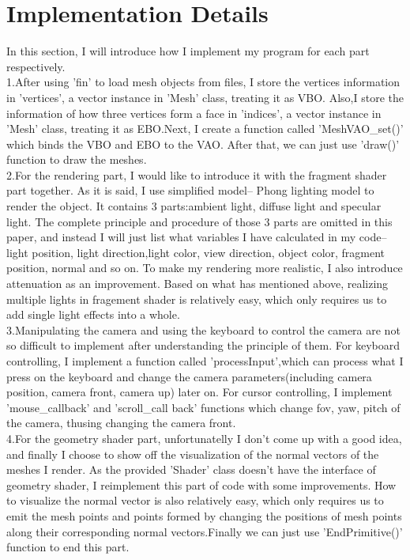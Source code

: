 \documentclass[acmtog]{acmart}
\begin{document}
\section{Implementation Details}
\qquad In this section, I will introduce how I implement my program for each part respectively.
\\\indent1.After using 'fin' to load mesh objects from files, I store the vertices information in 'vertices', a vector instance in 'Mesh' class, treating it as VBO. Also,I store the information of how three vertices form a face in 'indices', a vector instance in 'Mesh' class, treating it as EBO.Next, I create a function called 'MeshVAO\_set()' which binds the VBO and EBO to the VAO. After that, we can just use 'draw()' function to draw the meshes.
\\\indent2.For the rendering part, I would like to introduce it with the fragment shader part together. As it is said, I use simplified model-- Phong lighting model to render the object. It contains 3 parts:ambient light, diffuse light and specular light. The complete principle and procedure of those 3 parts are omitted in this paper, and instead I will just list what variables I have calculated in my code--light position, light direction,light color, view direction, object color, fragment position, normal and so on. To make my rendering more realistic, I also introduce attenuation as an improvement. Based on what has mentioned above, realizing multiple lights in fragement shader is relatively easy, which only requires us to add single light effects into a whole.
\\\indent3.Manipulating the camera and using the keyboard to control the camera are not so difficult to implement after understanding the principle of them. For keyboard controlling, I implement a function called 'processInput',which can process what I press on the keyboard and change the camera parameters(including camera position, camera front, camera up) later on. For cursor controlling, I implement 'mouse\_callback' and 'scroll\_call back' functions which change fov, yaw, pitch of the camera, thusing changing the camera front.
\\\indent4.For the geometry shader part, unfortunatelly I don't come up with a good idea, and finally I choose to show off the visualization of the normal vectors of the meshes I render. As the provided 'Shader' class doesn't have the interface of geometry shader, I reimplement this part of code with some improvements. How to visualize the normal vector is also relatively easy, which only requires us to emit the mesh points and points formed by changing the positions of mesh points along their corresponding normal vectors.Finally we can just use 'EndPrimitive()' function to end this part. 
\end{document}
